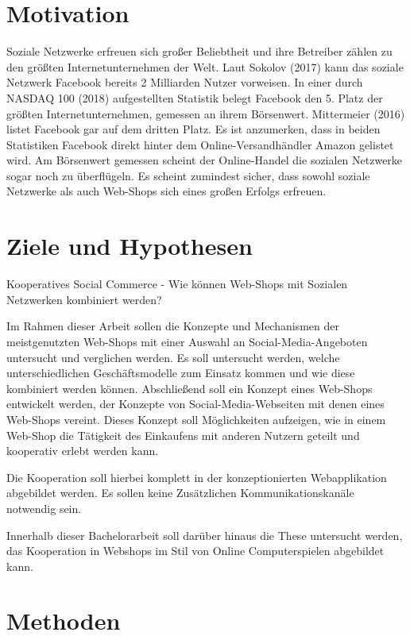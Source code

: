 \section{Motivation}

Soziale Netzwerke erfreuen sich großer Beliebtheit und ihre Betreiber zählen zu den größten Internetunternehmen der Welt. Laut Sokolov (2017) kann das soziale Netzwerk Facebook bereits 2 Milliarden Nutzer vorweisen. In einer durch NASDAQ 100 (2018) aufgestellten Statistik belegt Facebook den 5. Platz der größten Internetunternehmen, gemessen an ihrem Börsenwert. Mittermeier (2016) listet Facebook gar auf dem dritten Platz. Es ist anzumerken, dass in beiden Statistiken Facebook direkt hinter dem Online-Versandhändler Amazon gelistet wird. Am Börsenwert gemessen
scheint der Online-Handel die sozialen Netzwerke sogar noch zu überflügeln. Es scheint zumindest sicher, dass sowohl soziale Netzwerke als auch Web-Shops sich eines großen Erfolgs erfreuen.


\section{Ziele und Hypothesen}

Kooperatives Social Commerce
- Wie können Web-Shops mit Sozialen Netzwerken kombiniert werden?

Im Rahmen dieser Arbeit sollen die Konzepte und Mechanismen der meistgenutzten Web-Shops mit einer Auswahl an Social-Media-Angeboten untersucht und verglichen werden. Es soll untersucht werden, welche unterschiedlichen Geschäftsmodelle zum Einsatz kommen und wie diese kombiniert werden können. Abschließend soll ein Konzept eines Web-Shops entwickelt werden, der Konzepte von Social-Media-Webseiten mit denen eines Web-Shops vereint. Dieses Konzept soll Möglichkeiten aufzeigen, wie in einem Web-Shop die Tätigkeit des Einkaufens mit anderen Nutzern geteilt und kooperativ erlebt werden kann.

Die Kooperation soll hierbei komplett in der konzeptionierten Webapplikation abgebildet werden. Es sollen keine Zusätzlichen Kommunikationskanäle notwendig sein.

Innerhalb dieser Bachelorarbeit soll darüber hinaus die These untersucht werden, das Kooperation in Webshops im Stil von Online Computerspielen abgebildet kann.


\section{Methoden}

